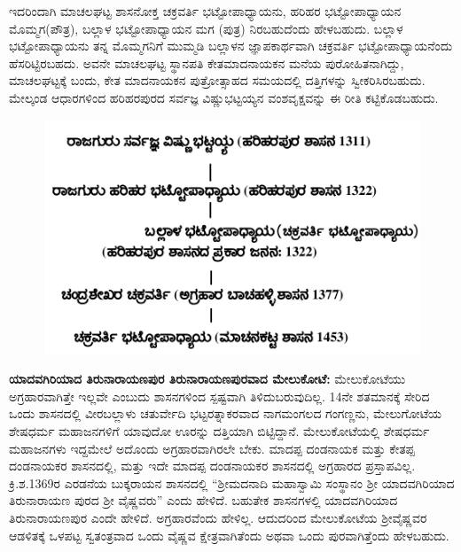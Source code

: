 ಇದರಿಂದಾಗಿ ಮಾಚಲಘಟ್ಟ ಶಾಸನೋಕ್ತ ಚಕ್ರವರ್ತಿ ಭಟ್ಟೋಪಾಧ್ಯಾಯನು, ಹರಿಹರ ಭಟ್ಟೋಪಾಧ್ಯಾಯನ ಮೊಮ್ಮಗ(ಪೌತ್ರ), ಬಲ್ಲಾಳ ಭಟ್ಟೋಪಾಧ್ಯಾಯನ ಮಗ (ಪುತ್ರ) ನಿರಬಹುದೆಂದು ಹೇಳಬಹುದು. ಬಲ್ಲಾಳ ಭಟ್ಟೋಪಾ\-ಧ್ಯಾಯನು ತನ್ನ ಮೊಮ್ಮಗನಿಗೆ ಮುಮ್ಮಡಿ ಬಲ್ಲಾಳನ ಜ್ಞಾಪಕಾರ್ಥವಾಗಿ ಚಕ್ರವರ್ತಿ ಭಟ್ಟೋಪಾಧ್ಯಾಯ\-ನೆಂದು ಹೆಸರಿಟ್ಟಿರ\-ಬಹದು. ಅವನೇ ಮಾಚಲಘಟ್ಟ ಸ್ಥಾನಪತಿ ಕೇತಮಾದನಾಯಕನ ಮನೆಯ ಪುರೋಹಿತನಾಗಿದ್ದು, ಮಾಚಲಘಟ್ಟಕ್ಕೆ ಬಂದು, ಕೇತ ಮಾದನಾಯಕನ ಪುತ್ರೋತ್ಸಾಹದ ಸಮಯದಲ್ಲಿ ದತ್ತಿಗಳನ್ನು ಸ್ವೀಕರಿಸಿರಬಹುದು. ಮೇಲ್ಕಂಡ ಆಧಾರಗಳಿಂದ ಹರಿಹರಪುರದ ಸರ್ವಜ್ಞ ವಿಷ್ಣುಭಟ್ಟಯ್ಯನ ವಂಶವೃಕ್ಷವನ್ನು ಈ ರೀತಿ ಕಟ್ಟಿಕೊಡಬಹುದು.

\begin{figure}[!h]
\includegraphics[scale=1.1]{images/chap4/add-chap4fig2.jpeg}
\end{figure}

\textbf{ಯಾದವಗಿರಿಯಾದ ತಿರುನಾರಾಯಣಪುರ \general{\enginline{-}} ತಿರುನಾರಾಯಣಪುರವಾದ ಮೇಲುಕೋಟೆ:} ಮೇಲುಕೋಟೆಯು ಅಗ್ರಹಾರವಾಗಿತ್ತೇ ಇಲ್ಲವೇ ಎಂಬುದು ಶಾಸನಗಳಿಂದ ಸ್ಪಷ್ಟವಾಗಿ ತಿಳಿದುಬರುವುದಿಲ್ಲ. 14ನೇ ಶತಮಾನಕ್ಕೆ ಸೇರಿದ ಒಂದು ಶಾಸನದಲ್ಲಿ ವೀರಬಲ್ಲಾಳು ಚತುರ್ವೇದಿ ಭಟ್ಟರತ್ನಾಕರವಾದ ನಾಗಮಂಗಲದ ಗಂಗಣ್ಣನು, ಮೇಲುಗೋಟೆಯ ಶೇಷಧರ್ಮ ಮಹಾಜನಗಳಿಗೆ ಯಾವುದೋ ಊರನ್ನು ದತ್ತಿಯಾಗಿ ಬಿಟ್ಟಿದ್ದಾನೆ. ಮೇಲುಕೋಟೆಯಲ್ಲಿ ಶೇಷಧರ್ಮ ಮಹಾಜನಗಳು ಇದ್ದಮೇಲೆ ಅದೊಂದು ಅಗ್ರಹಾರವಾಗಿರಲೇ ಬೇಕು. ಮಾದಪ್ಪ ದಂಡನಾಯಕ ಮತ್ತು ಕೇತಪ್ಪ ದಂಡನಾಯಕರ ಶಾಸನದಲ್ಲಿ, ಮತ್ತು ಇದೇ ಮಾದಪ್ಪ ದಂಡನಾಯಕರ ಶಾಸನದಲ್ಲಿ ಅಗ್ರಹಾರದ ಪ್ರಸ್ತಾಪವಿಲ್ಲ. ಕ್ರಿ.ಶ.1369ರ ಎರಡನೆಯ ಬುಕ್ಕರಾಯನ ಶಾಸನದಲ್ಲಿ “ಶ‍್ರೀಮದನಾದಿ ಮಹಾಸ್ವಾಮಿ ಸಂಸ್ಥಾನಂ ಶ‍್ರೀ ಯಾದವಗಿರಿಯಾದ ತಿರುನಾರಾಯಣ ಪುರದ ಶ‍್ರೀ ವೈಷ್ಣವರು” ಎಂದು ಹೇಳಿದೆ. ಬಹುತೇಕ ಶಾಸನಗಳಲ್ಲಿ ಯಾದವಗಿರಿಯಾದ ತಿರುನಾರಾಯಣಪುರ ಎಂದೇ ಹೇಳಿದೆ. ಅಗ್ರಹಾರವೆಂದು ಹೇಳಿಲ್ಲ. ಆದುದರಿಂದ ಮೇಲುಕೋಟೆಯ ಶ‍್ರೀವೈಷ್ಣವರ ಆಡಳಿತಕ್ಕೆ ಒಳಪಟ್ಟ ಸ್ವತಂತ್ರವಾದ ಒಂದು ವೈಷ್ಣವ ಕ್ಷೇತ್ರವಾಗಿತೆಂದು ಅಥವಾ ಒಂದು ಪುರವಾಗಿತ್ತೆಂದು ಹೇಳಬಹುದು.


